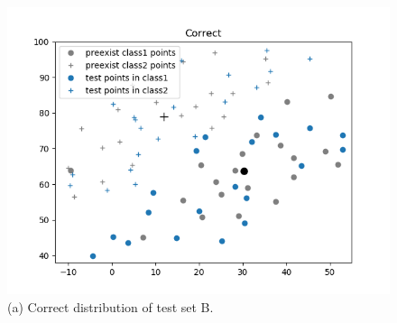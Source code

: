 \documentclass[10.5pt]{jsarticle}
\begin{document}
\begin{figure}[hbtp]
  \centering
  \includegraphics[width=26cm, bb=9 9 700 350]{results/CorrectResultFigureB.png}
  \caption{(a) Correct distribution of test set B.}
\end{figure}
\end{document}
